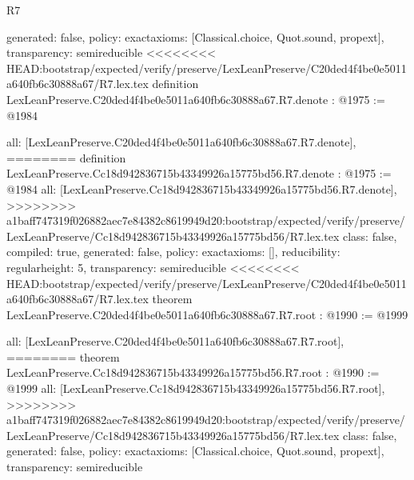 \begin{lexlean}{R7}
\begin{coremodule}
{{{{{{{{{{{{  generated: false,
  policy: exact{axioms: [Classical.choice, Quot.sound, propext]},
  transparency: semireducible
}
<<<<<<<< HEAD:bootstrap/expected/verify/preserve/LexLeanPreserve/C20ded4f4be0e5011a640fb6c30888a67/R7.lex.tex
definition LexLeanPreserve.C20ded4f4be0e5011a640fb6c30888a67.R7.denote : @1975 := @1984 {
  all: [LexLeanPreserve.C20ded4f4be0e5011a640fb6c30888a67.R7.denote],
========
definition LexLeanPreserve.Cc18d942836715b43349926a15775bd56.R7.denote : @1975 := @1984 {
  all: [LexLeanPreserve.Cc18d942836715b43349926a15775bd56.R7.denote],
>>>>>>>> a1baff747319f026882aec7e84382c8619949d20:bootstrap/expected/verify/preserve/LexLeanPreserve/Cc18d942836715b43349926a15775bd56/R7.lex.tex
  class: false,
  compiled: true,
  generated: false,
  policy: exact{axioms: []},
  reducibility: regular{height: 5},
  transparency: semireducible
}
<<<<<<<< HEAD:bootstrap/expected/verify/preserve/LexLeanPreserve/C20ded4f4be0e5011a640fb6c30888a67/R7.lex.tex
theorem LexLeanPreserve.C20ded4f4be0e5011a640fb6c30888a67.R7.root : @1990 := @1999 {
  all: [LexLeanPreserve.C20ded4f4be0e5011a640fb6c30888a67.R7.root],
========
theorem LexLeanPreserve.Cc18d942836715b43349926a15775bd56.R7.root : @1990 := @1999 {
  all: [LexLeanPreserve.Cc18d942836715b43349926a15775bd56.R7.root],
>>>>>>>> a1baff747319f026882aec7e84382c8619949d20:bootstrap/expected/verify/preserve/LexLeanPreserve/Cc18d942836715b43349926a15775bd56/R7.lex.tex
  class: false,
  generated: false,
  policy: exact{axioms: [Classical.choice, Quot.sound, propext]},
  transparency: semireducible
}

}}}}}}}}}}}}}
\end{coremodule}
\end{lexlean}
